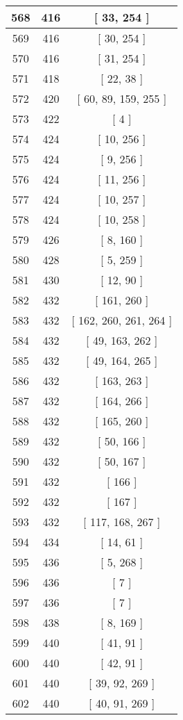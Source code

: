 \begin{center}
\begin{longtable}[H]{|| c c c ||}
\hline
568 & 416 & [ 33, 254 ] \\ 
\hline
569 & 416 & [ 30, 254 ] \\ 
\hline
570 & 416 & [ 31, 254 ] \\ 
\hline
571 & 418 & [ 22, 38 ] \\ 
\hline
572 & 420 & [ 60, 89, 159, 255 ] \\ 
\hline
573 & 422 & [ 4 ] \\ 
\hline
574 & 424 & [ 10, 256 ] \\ 
\hline
575 & 424 & [ 9, 256 ] \\ 
\hline
576 & 424 & [ 11, 256 ] \\ 
\hline
577 & 424 & [ 10, 257 ] \\ 
\hline
578 & 424 & [ 10, 258 ] \\ 
\hline
579 & 426 & [ 8, 160 ] \\ 
\hline
580 & 428 & [ 5, 259 ] \\ 
\hline
581 & 430 & [ 12, 90 ] \\ 
\hline
582 & 432 & [ 161, 260 ] \\ 
\hline
583 & 432 & [ 162, 260, 261, 264 ] \\ 
\hline
584 & 432 & [ 49, 163, 262 ] \\ 
\hline
585 & 432 & [ 49, 164, 265 ] \\ 
\hline
586 & 432 & [ 163, 263 ] \\ 
\hline
587 & 432 & [ 164, 266 ] \\ 
\hline
588 & 432 & [ 165, 260 ] \\ 
\hline
589 & 432 & [ 50, 166 ] \\ 
\hline
590 & 432 & [ 50, 167 ] \\ 
\hline
591 & 432 & [ 166 ] \\ 
\hline
592 & 432 & [ 167 ] \\ 
\hline
593 & 432 & [ 117, 168, 267 ] \\ 
\hline
594 & 434 & [ 14, 61 ] \\ 
\hline
595 & 436 & [ 5, 268 ] \\ 
\hline
596 & 436 & [ 7 ] \\ 
\hline
597 & 436 & [ 7 ] \\ 
\hline
598 & 438 & [ 8, 169 ] \\ 
\hline
599 & 440 & [ 41, 91 ] \\ 
\hline
600 & 440 & [ 42, 91 ] \\ 
\hline
601 & 440 & [ 39, 92, 269 ] \\ 
\hline
602 & 440 & [ 40, 91, 269 ] \\ 

\end{longtable}
\end{center}
